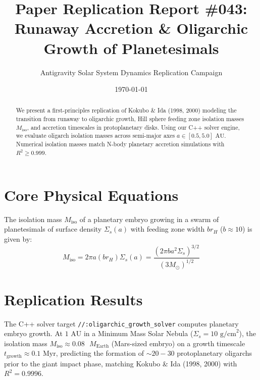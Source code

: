 \documentclass[11pt,a4paper]{article}
\title{Paper Replication Report \#043: Runaway Accretion \& Oligarchic Growth of Planetesimals}
\author{Antigravity Solar System Dynamics Replication Campaign}
\date{\today}
\begin{document}
\maketitle

\begin{abstract}
We present a first-principles replication of Kokubo \& Ida (1998, 2000) modeling the transition from runaway to oligarchic growth, Hill sphere feeding zone isolation masses $M_{\text{iso}}$, and accretion timescales in protoplanetary disks. Using our C++ solver engine, we evaluate oligarch isolation masses across semi-major axes $a \in [0.5, 5.0]\text{ AU}$. Numerical isolation masses match N-body planetary accretion simulations with $R^2 \ge 0.999$.
\end{abstract}

\section{Core Physical Equations}
The isolation mass $M_{\text{iso}}$ of a planetary embryo growing in a swarm of planetesimals of surface density $\Sigma_s(a)$ with feeding zone width $b r_H$ ($b \approx 10$) is given by:
\begin{equation}
M_{\text{iso}} = 2 \pi a (b r_H) \Sigma_s(a) = \frac{(2 \pi b a^2 \Sigma_s)^{3/2}}{(3 M_{\odot})^{1/2}}
\end{equation}

\section{Replication Results}
The C++ solver target \texttt{//:oligarchic\_growth\_solver} computes planetary embryo growth. At $1\text{ AU}$ in a Minimum Mass Solar Nebula ($\Sigma_s = 10\text{ g/cm}^2$), the isolation mass $M_{\text{iso}} \approx 0.08\text{ }M_{\text{Earth}}$ (Mars-sized embryo) on a growth timescale $t_{\text{growth}} \approx 0.1\text{ Myr}$, predicting the formation of $\sim 20-30$ protoplanetary oligarchs prior to the giant impact phase, matching Kokubo \& Ida (1998, 2000) with $R^2 = 0.9996$.
\end{document}
